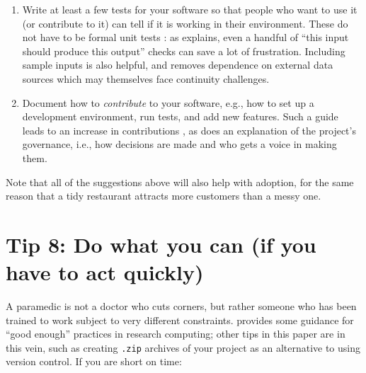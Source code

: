 \documentclass[10pt,letterpaper]{article}
\begin{document}
\begin{enumerate}
\item
  Write at least a few tests for your software
  so that people who want to use it (or contribute to it)
  can tell if it is working in their environment.
  These do not have to be formal unit tests \cite{Irving2021}:
  as \cite{Taschuk2017} explains,
  even a handful of ``this input should produce this output'' checks
  can save a lot of frustration.
  Including sample inputs is also helpful,
  and removes dependence on external data sources which may themselves face continuity challenges.

\item
  Document how to \emph{contribute} to your software,
  e.g.,
  how to set up a development environment,
  run tests,
  and add new features.
  Such a guide leads to an increase in contributions \cite{Sholler2019},
  as does an explanation of the project's governance,
  i.e.,
  how decisions are made and who gets a voice in making them.

\end{enumerate}

Note that all of the suggestions above will also help with adoption,
for the same reason that a tidy restaurant attracts more customers than a messy one.

\section*{Tip 8: Do what you can (if you have to act quickly)}

A paramedic is not a doctor who cuts corners,
but rather someone who has been trained to work subject to very different constraints.
\cite{Wilson2017} provides some guidance for ``good enough'' practices in research computing;
other tips in this paper are in this vein,
such as creating \texttt{.zip} archives of your project as an alternative to using version control.
If you are short on time:
\end{document}
